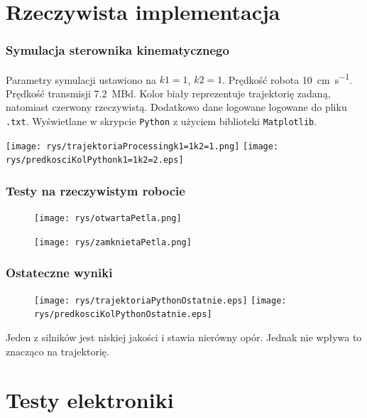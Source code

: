 \section{Rzeczywista implementacja}

	\begin{frame}
	\frametitle{Symulacja sterownika kinematycznego}  
		Parametry symulacji ustawiono na $k1 = 1$, $k2 = 1$. Prędkość robota \SI[per-mode=symbol]{10}{\centi\meter\per\second}. Prędkość transmisji \SI{7.2}{\mega Bd}. Kolor biały reprezentuje trajektorię zadaną, natomiast czerwony rzeczywistą. Dodatkowo dane logowane logowane do pliku \texttt{.txt}. Wyświetlane w skrypcie \texttt{Python} z użyciem biblioteki \texttt{Matplotlib}.
		\begin{center}
			\texttt{[image: rys/trajektoriaProcessingk1=1k2=1.png]}
			\texttt{[image: rys/predkosciKolPythonk1=1k2=2.eps]}
		\end{center}
		
	\end{frame}

	\begin{frame}
	\frametitle{Testy na rzeczywistym robocie}
	\begin{minipage}{0.24\textwidth}
	
		\begin{figure}
			\centering
			\texttt{[image: rys/otwartaPetla.png]}
		\end{figure}
\end{minipage}
	\hspace{3mm}
	\begin{minipage}{0.65\textwidth}
		\begin{figure}
			\centering
			\texttt{[image: rys/zamknietaPetla.png]}
		\end{figure}
	\end{minipage}
	\end{frame}

	\begin{frame}
	\frametitle{Ostateczne wyniki}
		\begin{figure}
			\centering
			\texttt{[image: rys/trajektoriaPythonOstatnie.eps]}
			\texttt{[image: rys/predkosciKolPythonOstatnie.eps]}
		\end{figure}
	Jeden z silników jest niskiej jakości i stawia nierówny opór. Jednak nie wpływa to znacząco na trajektorię.
	\end{frame}

\section{Testy elektroniki}

